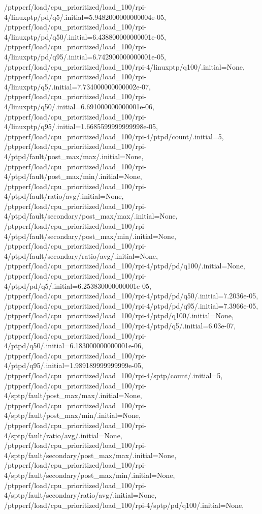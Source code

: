 {    /ptpperf/load/cpu_prioritized/load_100/rpi-4/linuxptp/pd/q5/.initial=5.9482000000000004e-05,
    /ptpperf/load/cpu_prioritized/load_100/rpi-4/linuxptp/pd/q50/.initial=6.438800000000001e-05,
    /ptpperf/load/cpu_prioritized/load_100/rpi-4/linuxptp/pd/q95/.initial=6.742900000000001e-05,
    /ptpperf/load/cpu_prioritized/load_100/rpi-4/linuxptp/q100/.initial=None,
    /ptpperf/load/cpu_prioritized/load_100/rpi-4/linuxptp/q5/.initial=7.734000000000002e-07,
    /ptpperf/load/cpu_prioritized/load_100/rpi-4/linuxptp/q50/.initial=6.691000000000001e-06,
    /ptpperf/load/cpu_prioritized/load_100/rpi-4/linuxptp/q95/.initial=1.6685599999999998e-05,
    /ptpperf/load/cpu_prioritized/load_100/rpi-4/ptpd/count/.initial=5,
    /ptpperf/load/cpu_prioritized/load_100/rpi-4/ptpd/fault/post_max/max/.initial=None,
    /ptpperf/load/cpu_prioritized/load_100/rpi-4/ptpd/fault/post_max/min/.initial=None,
    /ptpperf/load/cpu_prioritized/load_100/rpi-4/ptpd/fault/ratio/avg/.initial=None,
    /ptpperf/load/cpu_prioritized/load_100/rpi-4/ptpd/fault/secondary/post_max/max/.initial=None,
    /ptpperf/load/cpu_prioritized/load_100/rpi-4/ptpd/fault/secondary/post_max/min/.initial=None,
    /ptpperf/load/cpu_prioritized/load_100/rpi-4/ptpd/fault/secondary/ratio/avg/.initial=None,
    /ptpperf/load/cpu_prioritized/load_100/rpi-4/ptpd/pd/q100/.initial=None,
    /ptpperf/load/cpu_prioritized/load_100/rpi-4/ptpd/pd/q5/.initial=6.253830000000001e-05,
    /ptpperf/load/cpu_prioritized/load_100/rpi-4/ptpd/pd/q50/.initial=7.2036e-05,
    /ptpperf/load/cpu_prioritized/load_100/rpi-4/ptpd/pd/q95/.initial=7.3966e-05,
    /ptpperf/load/cpu_prioritized/load_100/rpi-4/ptpd/q100/.initial=None,
    /ptpperf/load/cpu_prioritized/load_100/rpi-4/ptpd/q5/.initial=6.03e-07,
    /ptpperf/load/cpu_prioritized/load_100/rpi-4/ptpd/q50/.initial=6.183000000000001e-06,
    /ptpperf/load/cpu_prioritized/load_100/rpi-4/ptpd/q95/.initial=1.989189999999999e-05,
    /ptpperf/load/cpu_prioritized/load_100/rpi-4/sptp/count/.initial=5,
    /ptpperf/load/cpu_prioritized/load_100/rpi-4/sptp/fault/post_max/max/.initial=None,
    /ptpperf/load/cpu_prioritized/load_100/rpi-4/sptp/fault/post_max/min/.initial=None,
    /ptpperf/load/cpu_prioritized/load_100/rpi-4/sptp/fault/ratio/avg/.initial=None,
    /ptpperf/load/cpu_prioritized/load_100/rpi-4/sptp/fault/secondary/post_max/max/.initial=None,
    /ptpperf/load/cpu_prioritized/load_100/rpi-4/sptp/fault/secondary/post_max/min/.initial=None,
    /ptpperf/load/cpu_prioritized/load_100/rpi-4/sptp/fault/secondary/ratio/avg/.initial=None,
    /ptpperf/load/cpu_prioritized/load_100/rpi-4/sptp/pd/q100/.initial=None,
}
